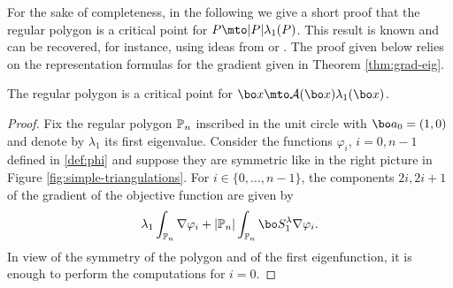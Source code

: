 For the sake of completeness, in the following we give a short proof that the regular polygon is a critical point for $P\mto |P|\lambda_1(P)$. This result is known and can be recovered, for instance, using ideas from \cite{FragalaVelichkov19} or \cite[Ch.\,1]{beniphd}. The proof given below relies on the representation formulas for the gradient given in Theorem \ref{thm:grad-eig}.

\begin{thm}
The regular polygon is a critical point for $\bo x \mto \mathcal A(\bo x)\lambda_1(\bo x)$.
\label{thm:critical-point}
\end{thm}

\begin{proof}
Fix the regular polygon $\Bbb P_n$ inscribed in the unit circle with $\bo a_0 = (1,0)$ and denote by $\lambda_1$ its first eigenvalue.
Consider the functions $\varphi_i$, $i=0,n-1$ defined in \eqref{def:phi} and suppose they are symmetric like in the right picture in Figure \ref{fig:simple-triangulations}. For $i \in \{0,\dots,n-1\}$, the components $2i, 2i+1$ of the gradient of the objective function are given by
\[
\lambda_1 \int_{\Bbb P_n} \nabla \varphi_i + |\Bbb P_n| \int_{\Bbb P_n} \bo S_1^\lambda \nabla \varphi_i.
\]
In view of the symmetry of the polygon and of the first eigenfunction, it is enough to perform the computations for $i=0$.


\end{proof}
